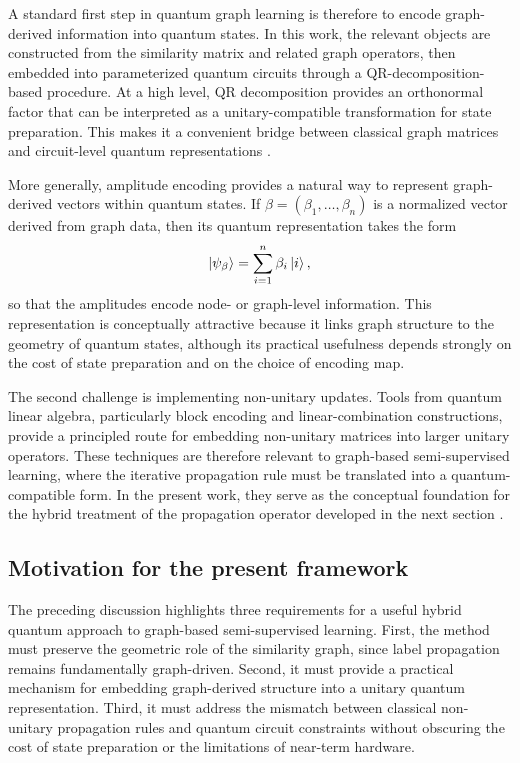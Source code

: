 \documentclass[11pt,a4paper]{article}
\begin{document}
A standard first step in quantum graph learning is therefore to encode graph-derived information into quantum states. In this work, the relevant objects are constructed from the similarity matrix and related graph operators, then embedded into parameterized quantum circuits through a QR-decomposition-based procedure. At a high level, QR decomposition provides an orthonormal factor that can be interpreted as a unitary-compatible transformation for state preparation. This makes it a convenient bridge between classical graph matrices and circuit-level quantum representations \cite{schuld2019quantum,beer2023quantum}.

More generally, amplitude encoding provides a natural way to represent graph-derived vectors within quantum states. If \(\beta=(\beta_1,\dots,\beta_n)\) is a normalized vector derived from graph data, then its quantum representation takes the form
\[
\ket{\psi_\beta}=\sum_{i=1}^{n}\beta_i \ket{i},
\]
so that the amplitudes encode node- or graph-level information. This representation is conceptually attractive because it links graph structure to the geometry of quantum states, although its practical usefulness depends strongly on the cost of state preparation and on the choice of encoding map.

The second challenge is implementing non-unitary updates. Tools from quantum linear algebra, particularly block encoding and linear-combination constructions, provide a principled route for embedding non-unitary matrices into larger unitary operators. These techniques are therefore relevant to graph-based semi-supervised learning, where the iterative propagation rule must be translated into a quantum-compatible form. In the present work, they serve as the conceptual foundation for the hybrid treatment of the propagation operator developed in the next section \cite{childs2012}.

\subsection{Motivation for the present framework}\label{subsec:motivation_framework}

The preceding discussion highlights three requirements for a useful hybrid quantum approach to graph-based semi-supervised learning. First, the method must preserve the geometric role of the similarity graph, since label propagation remains fundamentally graph-driven. Second, it must provide a practical mechanism for embedding graph-derived structure into a unitary quantum representation. Third, it must address the mismatch between classical non-unitary propagation rules and quantum circuit constraints without obscuring the cost of state preparation or the limitations of near-term hardware.
\end{document}
